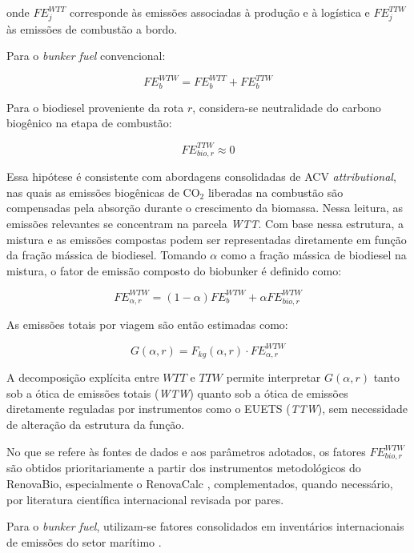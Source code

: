 onde $FE_j^{WTT}$ corresponde às emissões associadas à produção e à logística e $FE_j^{TTW}$ às emissões de combustão a bordo.

Para o \emph{bunker fuel} convencional:

\[
FE_b^{WTW} = FE_b^{WTT} + FE_b^{TTW}
\]

Para o biodiesel proveniente da rota $r$, considera-se neutralidade do carbono biogênico na etapa de combustão:

\[
FE_{bio,r}^{TTW} \approx 0
\]

Essa hipótese é consistente com abordagens consolidadas de \gls{ACV} \emph{attributional}, nas quais as emissões biogênicas de CO$_2$ liberadas na combustão são compensadas pela absorção durante o crescimento da biomassa. Nessa leitura, as emissões relevantes se concentram na parcela \emph{WTT}. Com base nessa estrutura, a mistura e as emissões compostas podem ser representadas diretamente em função da fração mássica de biodiesel. Tomando $\alpha$ como a fração mássica de biodiesel na mistura, o fator de emissão composto do biobunker é definido como:

\begin{equation}
FE_{\alpha,r}^{WTW} = (1-\alpha)FE_b^{WTW} + \alpha FE_{bio,r}^{WTW}
\end{equation}

As emissões totais por viagem são então estimadas como:

\begin{equation}
G(\alpha,r) = F_{kg}(\alpha,r) \cdot FE_{\alpha,r}^{WTW}
\end{equation}

A decomposição explícita entre $WTT$ e $TTW$ permite interpretar $G(\alpha,r)$ tanto sob a ótica de emissões totais (\emph{WTW}) quanto sob a ótica de emissões diretamente reguladas por instrumentos como o \gls{EUETS} (\emph{TTW}), sem necessidade de alteração da estrutura da função.

No que se refere às fontes de dados e aos parâmetros adotados, os fatores $FE_{bio,r}^{WTW}$ são obtidos prioritariamente a partir dos instrumentos metodológicos do RenovaBio, especialmente o RenovaCalc \citep{agencia_nacional_do_petroleo_gas_natural_e_biocombustiveis_anp_renovacalc_2023}, complementados, quando necessário, por literatura científica internacional revisada por pares.

Para o \emph{bunker fuel}, utilizam-se fatores consolidados em inventários internacionais de emissões do setor marítimo \citep{european_environment_agency_emepeea_2019,intergovernmental_panel_on_climate_change_2006_2006,intergovernmental_panel_on_climate_change_2019_2019}.

